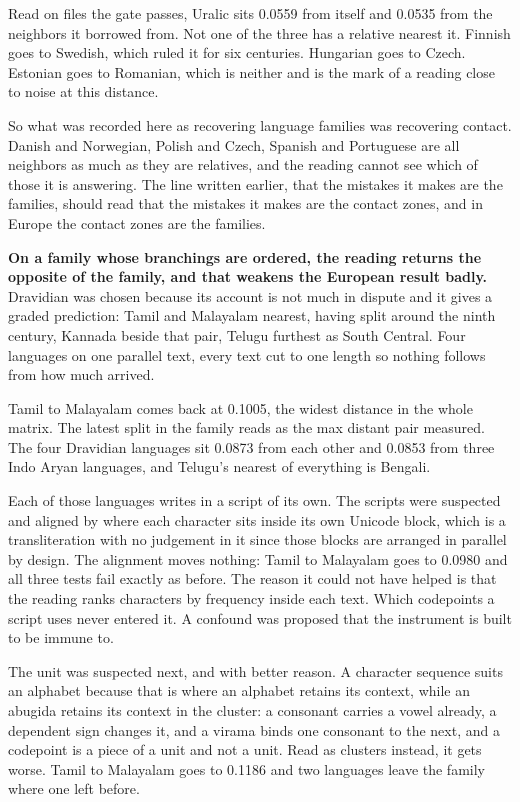 Read on files the gate passes, Uralic sits 0.0559 from itself and 0.0535 from the neighbors it borrowed from. Not one of the three has a relative nearest it. Finnish goes to Swedish, which ruled it for six centuries. Hungarian goes to Czech. Estonian goes to Romanian, which is neither and is the mark of a reading close to noise at this distance.

So what was recorded here as recovering language families was recovering contact. Danish and Norwegian, Polish and Czech, Spanish and Portuguese are all neighbors as much as they are relatives, and the reading cannot see which of those it is answering. The line written earlier, that the mistakes it makes are the families, should read that the mistakes it makes are the contact zones, and in Europe the contact zones are the families.

\textbf{On a family whose branchings are ordered, the reading returns the opposite of the family, and that weakens the European result badly.} Dravidian was chosen because its account is not much in dispute and it gives a graded prediction: Tamil and Malayalam nearest, having split around the ninth century, Kannada beside that pair, Telugu furthest as South Central. Four languages on one parallel text, every text cut to one length so nothing follows from how much arrived.

Tamil to Malayalam comes back at 0.1005, the widest distance in the whole matrix. The latest split in the family reads as the max distant pair measured. The four Dravidian languages sit 0.0873 from each other and 0.0853 from three Indo Aryan languages, and Telugu's nearest of everything is Bengali.

Each of those languages writes in a script of its own. The scripts were suspected and aligned by where each character sits inside its own Unicode block, which is a transliteration with no judgement in it since those blocks are arranged in parallel by design. The alignment moves nothing: Tamil to Malayalam goes to 0.0980 and all three tests fail exactly as before. The reason it could not have helped is that the reading ranks characters by frequency inside each text. Which codepoints a script uses never entered it. A confound was proposed that the instrument is built to be immune to.

The unit was suspected next, and with better reason. A character sequence suits an alphabet because that is where an alphabet retains its context, while an abugida retains its context in the cluster: a consonant carries a vowel already, a dependent sign changes it, and a virama binds one consonant to the next, and a codepoint is a piece of a unit and not a unit. Read as clusters instead, it gets worse. Tamil to Malayalam goes to 0.1186 and two languages leave the family where one left before.

